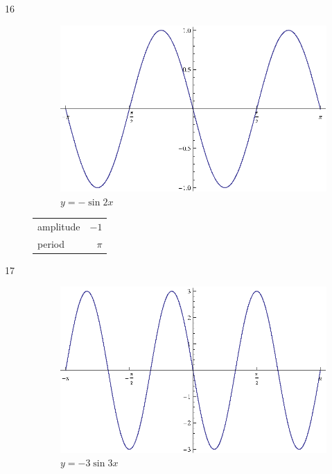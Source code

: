 \documentclass{exam}
\begin{document}
\begin{description}
      \item[16]
        \begin{figure}[H]
          \centering
          \includegraphics[scale=0.9]{exercise16.eps}
          \caption{$y = - \sin 2x$}
        \end{figure}

        \begin{tabular}[H]{lr}
          \toprule
          amplitude & $-1$ \\
          period    & $\pi$ \\
          \bottomrule
        \end{tabular}

      \item[17]
        \begin{figure}[H]
          \centering
          \includegraphics[scale=0.9]{exercise17.eps}
          \caption{$y = - 3 \sin 3x$}
        \end{figure}


\end{description}
\end{document}
